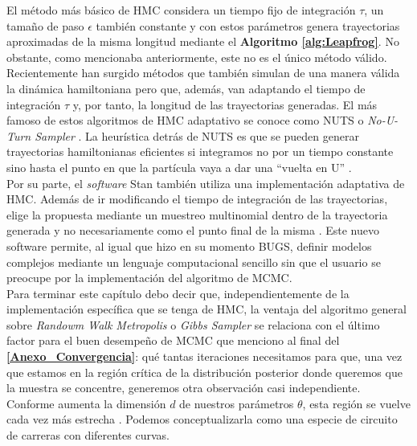 El método más básico de HMC considera un tiempo fijo de integración $\tau$, un tamaño de paso $\epsilon$ también constante y con estos parámetros genera  trayectorias aproximadas de la misma longitud mediante el \textbf{Algoritmo \ref{alg:Leapfrog}}. No obstante, como mencionaba anteriormente, este no es el único método válido. Recientemente han surgido métodos que también simulan de una manera válida la dinámica hamiltoniana pero que, además, van adaptando el tiempo de integración $\tau$ y, por tanto, la longitud de las trayectorias generadas. El más famoso de estos algoritmos de HMC adaptativo se conoce como NUTS o \textit{No-U-Turn Sampler} \parencite{NUTS11}. La heurística detrás de NUTS es que se pueden generar trayectorias hamiltonianas eficientes si integramos no por un tiempo constante sino hasta el punto en que la partícula vaya a dar una ``vuelta en U'' \parencite{Betancourt17,McElreath17}.\\

Por su parte, el \textit{software} Stan también utiliza una implementación adaptativa de HMC. Además de ir modificando el tiempo de integración de las trayectorias, elige la propuesta mediante un muestreo multinomial dentro de la trayectoria generada y no necesariamente como el punto final de la misma \parencite{Betancourt16,TuitSimpson18}. Este nuevo software permite, al igual que hizo en su momento BUGS, definir modelos complejos mediante un lenguaje computacional sencillo sin que el usuario se preocupe por la implementación del algoritmo de MCMC.\\

Para terminar este capítulo debo decir que, independientemente de la implementación específica que se tenga de HMC, la ventaja del algoritmo general sobre \textit{Randowm Walk Metropolis} o \textit{Gibbs Sampler} se relaciona con el último factor para el buen desempeño de MCMC que menciono al final del \textbf{\autoref{Anexo_Convergencia}}: qué tantas iteraciones necesitamos para que, una vez que estamos en la región crítica de la distribución posterior donde queremos que la muestra se concentre, generemos otra observación casi independiente. Conforme aumenta la dimensión $d$ de nuestros parámetros $\theta$, esta región se vuelve cada vez más estrecha \parencites{Betancourt17,McElreath17}. Podemos conceptualizarla como una especie de circuito de carreras con diferentes curvas.\\ 

